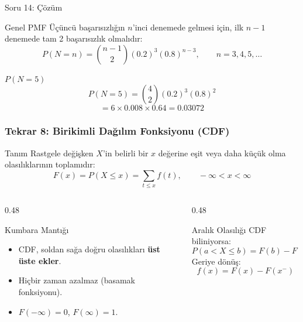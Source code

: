 \documentclass[light]{lutbeamer}
\begin{document}
\begin{frame}{Soru 14: Çözüm}
\scriptsize
\begin{block}{Genel PMF}
    Üçüncü başarısızlığın $n$'inci denemede gelmesi için, ilk $n-1$ denemede tam 2 başarısızlık olmalıdır:
    \[
    P(N=n)=\binom{n-1}{2}(0.2)^3(0.8)^{n-3},
    \qquad n=3,4,5,\ldots
    \]
\end{block}

\begin{block}{$P(N=5)$}
    \[
    P(N=5)=\binom{4}{2}(0.2)^3(0.8)^2
    \]
    \[
    =6 \times 0.008 \times 0.64 = 0.03072
    \]
\end{block}
\end{frame}

\begin{frame}[fragile]
    \frametitle[CDF]{Tekrar 8: Birikimli Dağılım Fonksiyonu (CDF)}
    \small
    \begin{block}{Tanım}
        Rastgele değişken $X$'in belirli bir $x$ değerine eşit veya daha küçük olma olasılıklarının toplamıdır:
        \[
        F(x) = P(X \le x) = \sum_{t \le x} f(t), \qquad -\infty < x < \infty
        \]
    \end{block}

    \begin{columns}[T]
        \begin{column}{0.48\textwidth}
            \begin{exampleblock}{Kumbara Mantığı}
                \begin{itemize}
                    \item CDF, soldan sağa doğru olasılıkları \textbf{üst üste ekler}.
                    \item Hiçbir zaman azalmaz (basamak fonksiyonu).
                    \item $F(-\infty) = 0$, \; $F(\infty) = 1$.
                \end{itemize}
            \end{exampleblock}
        \end{column}
        \begin{column}{0.48\textwidth}
            \begin{block}{Aralık Olasılığı}
                CDF biliniyorsa:
                \[
                P(a < X \le b) = F(b) - F(a)
                \]
                Geriye dönüş:
                \[
                f(x) = F(x) - F(x^{-})
                \]
            \end{block}
        \end{column}
    \end{columns}
\end{frame}
\end{document}
